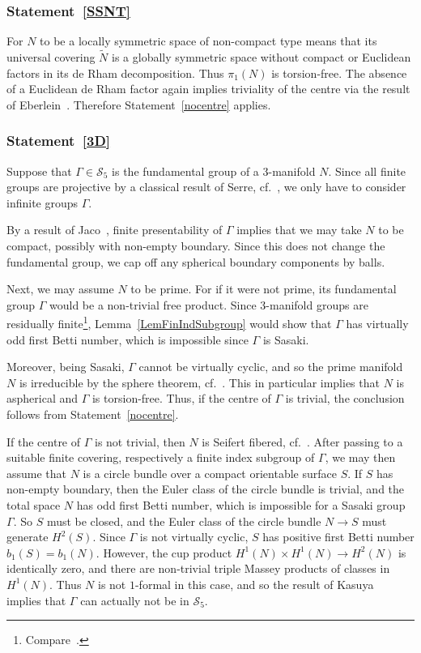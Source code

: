 \documentclass[12pt,leqno]{amsart}
\newcommand{\lra}{\longrightarrow}
\newcommand{\Sg}{\mathcal{S}}
\begin{document}
\subsubsection*{Statement~\ref{SSNT}}

 For $N$ to be a locally symmetric space of non-compact type means
  that its universal covering $\tilde N$ is a globally symmetric space
  without compact or Euclidean factors in its de Rham decomposition.
  Thus $\pi_1(N)$ is torsion-free. The absence of a Euclidean de Rham factor 
  again implies triviality of the centre via  the
  result of Eberlein~\cite[p.~210f]{EbJDG}.
 Therefore Statement~\ref{nocentre}  applies.


\subsubsection*{Statement~\ref{3D}}

Suppose that $\Gamma\in\Sg_5$ is the fundamental group of a $3$-manifold $N$.
Since all finite groups are projective by a classical result of Serre, cf.~\cite[p.~6]{ABCKT}, we
only have to consider infinite groups $\Gamma$.

By a result of Jaco~\cite{Jaco1}, finite presentability of $\Gamma$ implies that we may take $N$ to be compact,
possibly with non-empty boundary. Since this does not change the fundamental group, we cap off any
spherical boundary components by balls.

Next, we may assume $N$ to be prime. For if it were not prime, its fundamental group $\Gamma$
would be a non-trivial free product. Since $3$-manifold groups are residually 
finite\footnote{Compare~\cite[p.~60]{aschenbrennerfriedlwilton15}.}, Lemma~\ref{LemFinIndSubgroup} 
would show that $\Gamma$ has virtually odd first Betti number, which is impossible since $\Gamma$ is Sasaki.

Moreover, being Sasaki, $\Gamma$ cannot be virtually cyclic, and so the prime manifold $N$ is irreducible by the 
sphere theorem, cf.~\cite{Mil}. This in particular implies that  $N$ is aspherical and $\Gamma$ is torsion-free.
Thus, if the centre of $\Gamma$ is trivial, the conclusion follows from Statement~\ref{nocentre}.

If the centre of $\Gamma$ is not trivial, then $N$ is Seifert fibered, cf.~\cite[Theorem~2.5.5]{aschenbrennerfriedlwilton15}.
After passing to a suitable finite covering, respectively a finite index subgroup of $\Gamma$, we may then
assume that $N$ is a circle bundle over a compact orientable surface $S$. If $S$ has non-empty boundary,
then the Euler class of the circle bundle is trivial, and the total space $N$ has odd first Betti number,
which is impossible for a Sasaki group $\Gamma$. So $S$ must be closed, and the Euler class of the circle
bundle $N\lra S$ must generate $H^2(S)$. Since $\Gamma$ is not virtually cyclic, $S$ has positive 
first Betti number $b_1(S)=b_1(N)$. However, the cup product $H^1(N)\times H^1(N)\lra H^2(N)$ is 
identically zero, and there are non-trivial triple Massey products of classes in $H^1(N)$.
Thus $N$ is not $1$-formal in this case, and so the result of Kasuya~\cite[Theorem~1.1]{Kas1} implies that
$\Gamma$ can actually not be in $\Sg_5$. 
\end{document}
